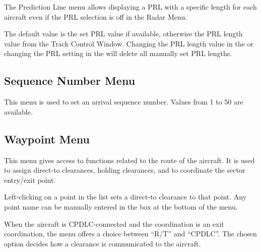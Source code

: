 \documentclass[a4paper,oneside,11pt]{memoir}
\begin{document}

The Prediction Line menu allows displaying a PRL with a specific length for each aircraft even if the PRL selection is off in the Radar Menu.

\bigskip

The default value is the set PRL value if available, otherwise the PRL length value from the Track Control Window. Changing the PRL length value in the  or changing the PRL setting in the  will delete all manually set PRL lengths.

\subsection{Sequence Number Menu}
\label{menu:seq}


This menu is used to set an arrival sequence number. Values from 1 to 50 are available.

\bigskip


\subsection{Waypoint Menu}
\label{menu:wpt}


This menu gives access to functions related to the route of the aircraft. It is used to assign direct-to clearances, holding clearances, and to coordinate the sector entry/exit point.

\bigskip

Left-clicking on a point in the list sets a direct-to clearance to that point. Any point name can be manually entered in the box at the bottom of the menu.


\bigskip

When the aircraft is CPDLC-connected and the coordination is an exit coordination, the menu offers a choice between “R/T” and “CPDLC”. The chosen option decides how a clearance is communicated to the aircraft.
\end{document}
